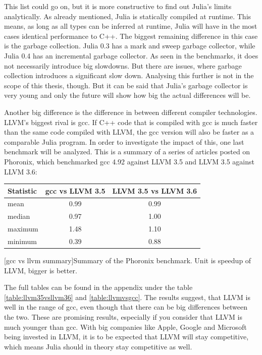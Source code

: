 This list could go on, but it is more constructive to find out Julia's limits analytically.
As already mentioned, Julia is statically compiled at runtime. This means, as long as all types can be inferred at runtime, Julia will have in the most cases identical performance to C++.
The biggest remaining difference in this case is the garbage collection. Julia 0.3 has a mark and sweep garbage collector, while Julia 0.4 has an incremental garbage collector.
As seen in the benchmarks, it does not necessarily introduce big slowdowns.
But there are issues, where garbage collection introduces a significant slow down\cite{ReadDlmGC}.
Analysing this further is not in the scope of this thesis, though. 
But it can be said that Julia's garbage collector is very young and only the future will show how big the actual differences will be.

Another big difference is the difference in between different compiler technologies.
\ac{LLVM}'s biggest rival is \ac{gcc}. If C++ code that is compiled with \ac{gcc} is much faster than the same code compiled with \ac{LLVM}, the \ac{gcc} version will also be faster as a comparable Julia program.
In order to investigate the impact of this, one last benchmark will be analyzed.
This is a summary of a series of articles posted on Phoronix, which benchmarked \ac{gcc} 4.92 against \ac{LLVM} 3.5 and \ac{LLVM} 3.5 against \ac{LLVM} 3.6:
\begin{table}[ht]
  \centering
  \begin{tabular}{l|c|c}
    \hline
    \textbf{Statistic} & \textbf{\ac{gcc} vs \ac{LLVM} 3.5} & \textbf{\ac{LLVM} 3.5 vs \ac{LLVM} 3.6} \\
    \hline
    mean & 0.99 & 0.99 \\
    median & 0.97 & 1.00 \\
    maximum & 1.48 & 1.10 \\
    minimum & 0.39 & 0.88 \\
    \hline
  \end{tabular}
    [gcc vs llvm summary]{Summary of the Phoronix benchmark. Unit is speedup of LLVM, bigger is better. \cite{LLVM35vsLLVM36}\cite{LLVMvsGCC}\cite{Phoronix}}
    \label{table:gccvsllvm}
\end{table}

The full tables can be found in the appendix under the table \ref{table:llvm35vsllvm36} and \ref{table:llvmvsgcc}.
The results suggest, that \ac{LLVM} is well in the range of \ac{gcc}, even though that there can be big differences between the two.
These are promising results, especially if you consider that LLVM is much younger than gcc. 
With big companies like Apple, Google\cite{GoogleAppleLLVM} and Microsoft\cite{MicrosoftLLVM} being invested in LLVM, it is to be expected that \ac{LLVM} will stay competitive, which means Julia should in theory stay competitive as well.


